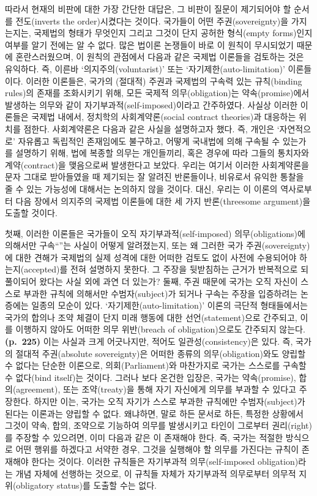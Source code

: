 따라서 현재의 비판에 대한 가장 간단한 대답은, 그 비판이 질문이
제기되어야 할 순서를 전도(inverts the order)시켰다는 것이다. 국가들이
어떤 주권(sovereignty)을 가지는지는, 국제법의 형태가 무엇인지 그리고
그것이 단지 공허한 형식(empty forms)인지 여부를 알기 전에는 알 수 없다.
많은 법이론 논쟁들이 바로 이 원칙이 무시되었기 때문에 혼란스러웠으며, 이
원칙의 관점에서 다음과 같은 국제법 이론들을 검토하는 것은 유익하다. 즉,
이른바 `의지주의(voluntarist)' 또는 `자기제한(auto-limitation)'
이론들이다. 이러한 이론들은, 국가의 (절대적) 주권과 국제법의 구속력 있는
규칙(binding rules)의 존재를 조화시키기 위해, 모든 국제적
의무(obligation)는 약속(promise)에서 발생하는 의무와 같이
자기부과적(self-imposed)이라고 간주하였다. 사실상 이러한 이론들은 국제법
내에서, 정치학의 사회계약론(social contract theories)과 대응하는 위치를
점한다. 사회계약론은 다음과 같은 사실을 설명하고자 했다. 즉, 개인은
`자연적으로' 자유롭고 독립적인 존재임에도 불구하고, 어떻게 국내법에 의해
구속될 수 있는가를 설명하기 위해, 법에 복종할 의무는 개인들끼리, 혹은
경우에 따라 그들의 통치자와 계약(contract)을 맺음으로써 발생한다고
보았다. 우리는 여기서 이러한 사회계약론을 문자 그대로 받아들였을 때
제기되는 잘 알려진 반론들이나, 비유로서 유익한 통찰을 줄 수 있는
가능성에 대해서는 논의하지 않을 것이다. 대신, 우리는 이 이론의
역사로부터 다음 장에서 의지주의 국제법 이론들에 대한 세 가지
반론(threesome argument)을 도출할 것이다.

첫째, 이러한 이론들은 국가들이 오직 자기부과적(self-imposed)
의무(obligations)에 의해서만 구속``''는 사실이
어떻게 알려졌는지, 또는 왜 그러한 국가 주권(sovereignty)에 대한 견해가
국제법의 실제 성격에 대한 어떠한 검토도 없이 사전에 수용되어야
하는지(accepted)를 전혀 설명하지 못한다. 그 주장을 뒷받침하는 근거가
반복적으로 되풀이되어 왔다는 사실 외에 과연 더 있는가? 둘째, 주권 때문에
국가는 오직 자신이 스스로 부과한 규칙에 의해서만 수범자(subject)가
되거나 구속는 주장을 입증하려는 논증에는 일종의
모순이 있다. `자기제한(auto-limitation)' 이론의 극단적 형태들에서는
국가의 합의나 조약 체결이 단지 미래 행동에 대한 선언(statement)으로
간주되고, 이를 이행하지 않아도 어떠한 의무 위반(breach of
obligation)으로도 간주되지 않는다. \textbf{(p.~225)} 이는 사실과 크게
어긋나지만, 적어도 일관성(consistency)은 있다. 즉, 국가의 절대적
주권(absolute sovereignty)은 어떠한 종류의 의무(obligation)와도 양립할
수 없다는 단순한 이론으로, 의회(Parliament)와 마찬가지로 국가는 스스로를
구속할 수 없다(bind itself)는 것이다. 그러나 보다 온건한 입장은, 국가는
약속(promise), 합의(agreement), 또는 조약(treaty)을 통해 자기 자신에게
의무를 부과할 수 있다고 주장한다. 하지만 이는, 국가는 오직 자기가 스스로
부과한 규칙에만 수범자(subject)가 된다는 이론과는 양립할 수 없다.
왜냐하면, 말로 하든 문서로 하든, 특정한 상황에서 그것이 약속, 합의,
조약으로 기능하여 의무를 발생시키고 타인이 그로부터 권리(right)를 주장할
수 있으려면, 이미 다음과 같은 이 존재해야 한다. 즉,
국가는 적절한 방식으로 어떤 행위를 하겠다고 서약한 경우, 그것을 실행해야
할 의무를 가진다는 규칙이 존재해야 한다는 것이다. 이러한 규칙들은
자기부과적 의무(self-imposed obligation)라는 개념 자체에 선행하는
것으로, 이 규칙들 자체가 자기부과적 의무로부터 
의무적 지위(obligatory status)를 도출할 수는 없다.

